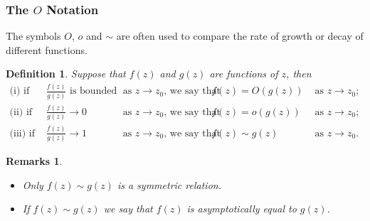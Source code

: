 \documentclass{article}
\theoremstyle{plain}\theoremheaderfont{\normalfont\itshape}\theorembodyfont{\rmfamily}\theoremseparator{.}\newtheorem*{rem}{Remark}\newtheorem*{ex}{Example}\newtheorem*{proof}{Proof}\newtheorem*{altp}{Alternative proof}
\theoremstyle{plain}\theoremheaderfont{\normalfont\bfseries}\theorembodyfont{\rmfamily}\theoremseparator{.}\newtheorem{thm}{Theorem}[section]\newtheorem{lem}[thm]{Lemma}\newtheorem{prop}[thm]{Proposition}\newtheorem*{cor}{Corollary}\newtheorem{defn}[thm]{Definition}\newtheorem{clm}[thm]{Claim}\newtheorem{clminproof}{Claim}
\theoremstyle{break}\theoremheaderfont{\normalfont\itshape}\theorembodyfont{\rmfamily}\theoremseparator{.\medskip}\newtheorem*{proofskip}{Proof}\newtheorem*{exs}{Examples}\newtheorem*{rems}{Remarks}
\theoremstyle{break}\theoremheaderfont{\normalfont\bfseries}\theorembodyfont{\rmfamily}\theoremseparator{.\medskip}\newtheorem{lemskip}[thm]{Lemma}\newtheorem{defnskip}[thm]{Definition}\newtheorem{propskip}[thm]{Proposition}\newtheorem{thmskip}[thm]{Theorem}
\numberwithin{equation}{section}
\begin{document}
	\subsubsection{The \(O\) Notation}
	The symbols \(O\), \(o\) and \(\sim\) are often used to compare the rate of growth or decay of different functions.
	
	\begin{defn}
		Suppose that \(f(z)\) and \(g(z)\) are functions of \(z\), then
		\begin{align*}
			\text{(i) }\text{if } &\frac{f(z)}{g(z)} \text{ is bounded} &\text{ as } z\to z_0 \text{, we say that } &f(z)=O(g(z)) &\text{ as } z\to z_0;\\
			\text{(ii) }\text{if } &\frac{f(z)}{g(z)}\to 0 &\text{ as } z\to z_0 \text{, we say that } &f(z)=o(g(z)) &\text{ as } z\to z_0;\\
			\text{(iii) }\text{if } &\frac{f(z)}{g(z)}\to 1 &\text{ as } z\to z_0 \text{, we say that } &f(z)\sim g(z) &\text{ as } z\to z_0.
		\end{align*}
	\end{defn}
	\begin{rems}
		\begin{itemize}[topsep=0pt]
			\item Only \(f(z)\sim g(z)\) is a symmetric relation.
			\item If \(f(z)\sim g(z)\) we say that \(f(z)\) is asymptotically equal to \(g(z)\).
		\end{itemize}
	\end{rems}
\end{document}
